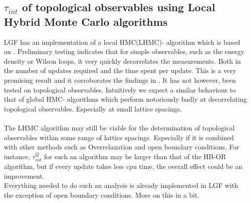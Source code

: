 \documentclass[a4paper,10pt]{book}
\begin{document}
\subsection{$\tau_{int}$ of topological observables using Local Hybrid Monte Carlo algorithms}
LGF has an implementation of a local HMC(LHMC)- algorithm which is based on \cite{Kennedy_1994}. Preliminary testing indicates that for simple observables, such as the energy density or Wilson loops, it very quickly decorrelates the measurements. Both in the number of updates required and the time spent per update. This is a very promising result and it corroborates the findings in \cite{LHMC_autocorr}. It has not however, been tested on topological observables. Intuitively we expect a similar behaviour to that of global HMC- algorithms which perform notoriously badly at decorrelating topological observables. Especially at small lattice spacings.\\\\The LHMC algorithm may still be viable for the determination of topological observables within some range of lattice spacings. Especially if it is combined with other methods such as Overrelaxation and open boundary conditions. For instance, $\tau_{int}^Q$ for such an algorithm may be larger than that of the HB-OR algorithm, but if every update takes less cpu time, the overall effect could be an improvement. \\Everything needed to do such an analysis is already implemented in LGF with the exception of open boundary conditions. More on this in a bit.
\end{document}
